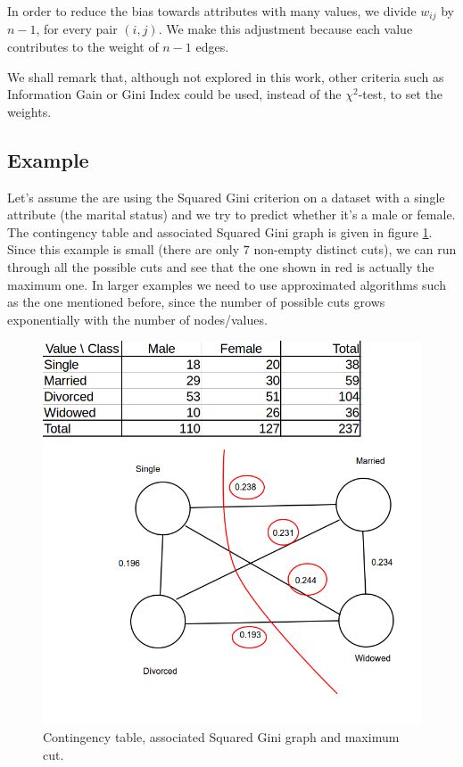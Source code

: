 In order to reduce the bias towards attributes with many values, we divide 
$w_{ij}$ by  $n-1$, for every pair $(i,j)$. We make this adjustment  because each value contributes
to the weight of $n-1$ edges.

We shall remark that, although not explored in this work,
other criteria such as Information Gain or Gini Index
could be used, instead of the $\chi^2$-test, to
set the weights.


\subsection{Example}

Let's assume the are using the Squared Gini criterion on a dataset with a single attribute (the marital status) and we try to predict whether it's a male or female.
The contingency table and associated Squared Gini graph is given in figure \ref{fig:cut-example}. Since this example is small (there are only $7$ non-empty distinct cuts), we can run through all the possible cuts and see that the one shown in red is actually the maximum one. In larger examples we need to use approximated algorithms such as the one mentioned before, since the number of possible cuts grows exponentially with the number of nodes/values.

\begin{figure}[h]
\includegraphics[width=\textwidth]{cut-example}
\caption{Contingency table, associated Squared Gini graph and maximum cut.}
\label{fig:cut-example}
\end{figure}

